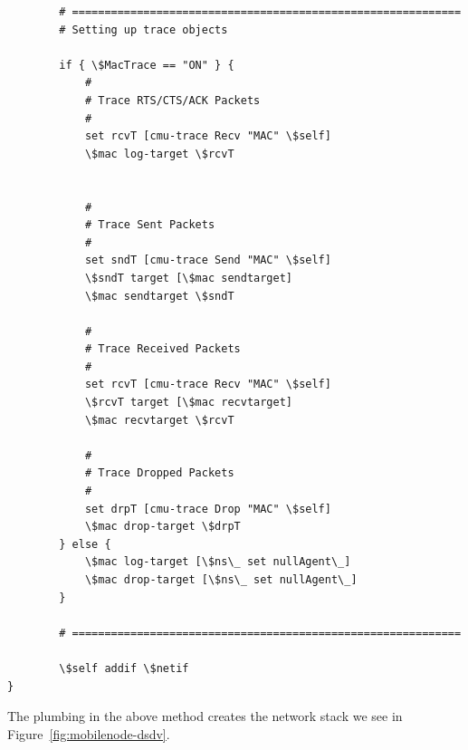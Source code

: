 \begin{verbatim}
        # ============================================================
        # Setting up trace objects
        
        if { \$MacTrace == "ON" } {
            #
            # Trace RTS/CTS/ACK Packets
            #
            set rcvT [cmu-trace Recv "MAC" \$self]
            \$mac log-target \$rcvT


            #
            # Trace Sent Packets
            #
            set sndT [cmu-trace Send "MAC" \$self]
            \$sndT target [\$mac sendtarget]
            \$mac sendtarget \$sndT

            #
            # Trace Received Packets
            #
            set rcvT [cmu-trace Recv "MAC" \$self]
            \$rcvT target [\$mac recvtarget]
            \$mac recvtarget \$rcvT

            #
            # Trace Dropped Packets
            #
            set drpT [cmu-trace Drop "MAC" \$self]
            \$mac drop-target \$drpT
        } else {
            \$mac log-target [\$ns\_ set nullAgent\_]
            \$mac drop-target [\$ns\_ set nullAgent\_]
        }

        # ============================================================

        \$self addif \$netif
}
\end{verbatim} %

The plumbing in the above method creates the network stack we see in
Figure~\ref{fig:mobilenode-dsdv}.

